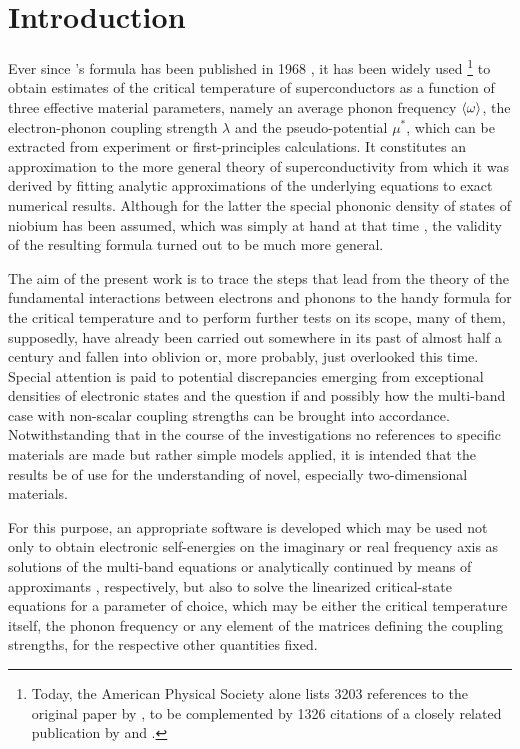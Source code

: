 
\chapter{Introduction}

Ever since 's formula has been published in 1968
\cite{McMillan68}, it has been widely used%
%
\footnote{Today, the American Physical Society alone lists 3203 references to
the original paper by , to be complemented by 1326 citations of a
closely related publication by  and 
\cite{AllenDynes75}.}
%
to obtain estimates of the critical temperature of superconductors as a function
of three effective material parameters, namely an average phonon frequency $\langle\omega\rangle$, the electron-phonon coupling strength $\lambda$ and the 
pseudo-potential $\mu^*$, which can be extracted from experiment
\cite{McMillanRowell69} or first-principles calculations. It constitutes an
approximation to the more general  theory of superconductivity
\cite{Eliashberg60} from which it was derived by fitting analytic approximations
of the underlying equations to exact numerical results. Although for the latter
the special phononic density of states of niobium has been assumed, which was
simply at hand at that time \cite{NakagawaWoods63}, the validity of the
resulting formula turned out to be much more general.

The aim of the present work is to trace the steps that lead from the theory of
the fundamental interactions between electrons and phonons to the handy formula
for the critical temperature and to perform further tests on its scope, many of
them, supposedly, have already been carried out somewhere in its past of almost
half a century and fallen into oblivion or, more probably, just overlooked this
time. Special attention is paid to potential discrepancies emerging from
exceptional densities of electronic states and the question if and possibly how
the multi-band case with non-scalar coupling strengths can be brought into
accordance. Notwithstanding that in the course of the investigations no
references to specific materials are made but rather simple models applied, it
is intended that the results be of use for the understanding of novel,
especially two-dimensional materials.

For this purpose, an appropriate software is developed which may be used not
only to obtain electronic self-energies on the imaginary or real frequency axis
as solutions of the multi-band  equations or analytically
continued by means of  approximants \cite{VidbergSerene77},
respectively, but also to solve the linearized critical-state equations for a
parameter of choice, which may be either the critical temperature itself, the
phonon frequency or any element of the matrices defining the coupling strengths,
for the respective other quantities fixed.

